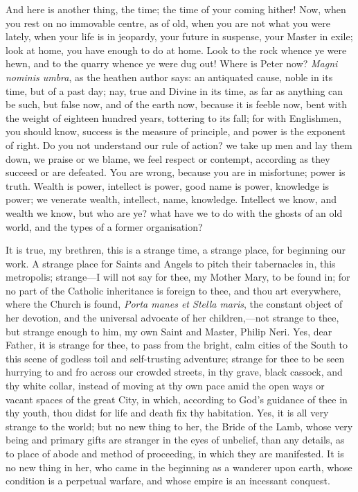 And here is another thing, the time; the time of your coming
hither! Now, when you rest on no immovable centre, as of old, when you
are not what you were lately, when your life is in jeopardy, your
future in suspense, your Master in exile; look at home, you have
enough to do at home. Look to the rock whence ye were hewn, and to the
quarry whence ye were dug out! Where is Peter now? \emph{Magni nominis
umbra}, as the heathen author says: an antiquated cause, noble in
its time, but of a past day; nay, true and Divine in its time, as far
as anything can be such, but false now, and of the earth now, because
it is feeble now, bent with the weight of eighteen hundred years,
tottering to its fall; for with Englishmen, you should know, success
is the measure of principle, and power is the exponent of right. Do
you not understand our rule of action? we take up men and lay them
down, we praise or we blame, we feel respect or contempt, according as
they succeed or are defeated. You are wrong, because you are in
misfortune; power is truth. Wealth is power, intellect is power, good
name is power, knowledge is power; we venerate wealth, intellect,
name, knowledge. Intellect we know, and wealth we know, but who are
ye? what have we to do with the ghosts of an old world, and the types
of a former organisation?

It is true, my brethren, this is a strange time, a strange place,
for beginning our work. A strange place for Saints and Angels to pitch
their tabernacles in, this metropolis; strange—I will not say for
thee, my Mother Mary, to be found in; for no part of the Catholic
inheritance is foreign to thee, and thou art everywhere, where the
Church is found, \emph{Porta manes et Stella maris}, the constant
object of her devotion, and the universal advocate of her children,—not
strange to thee, but strange enough to him, my own Saint and Master,
Philip Neri. Yes, dear Father, it is strange for thee, to pass from
the bright, calm cities of the South to this scene of godless toil and
self-trusting adventure; strange for thee to be seen hurrying to and
fro across our crowded streets, in thy grave, black cassock, and thy
white collar, instead of moving at thy own pace amid the open ways or
vacant spaces of the great City, in which, according to God's guidance
of thee in thy youth, thou didst for life and death fix thy
habitation. Yes, it is all very strange to the world; but no new thing
to her, the Bride of the Lamb, whose very being and primary gifts are
stranger in the eyes of unbelief, than any details, as to place of
abode and method of proceeding, in which they are manifested. It is no
new thing in her, who came in the beginning as a wanderer upon earth,
whose condition is a perpetual warfare, and whose empire is an
incessant conquest.

